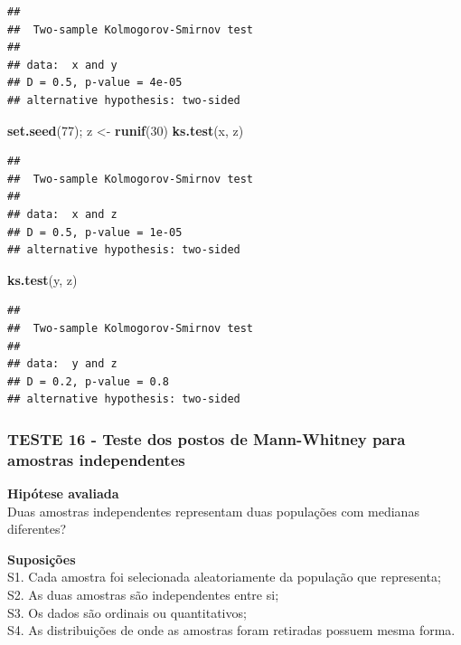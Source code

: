 \documentclass[
]{book}
\newenvironment{Shaded}{\begin{snugshade}}{\end{snugshade}}
\newcommand{\DecValTok}[1]{\textcolor[rgb]{0.00,0.00,0.81}{#1}}
\newcommand{\KeywordTok}[1]{\textcolor[rgb]{0.13,0.29,0.53}{\textbf{#1}}}
\newcommand{\NormalTok}[1]{#1}
\newcommand{\StringTok}[1]{\textcolor[rgb]{0.31,0.60,0.02}{#1}}
\theoremstyle{definition}
\theoremstyle{definition}
\theoremstyle{definition}
\theoremstyle{remark}
\begin{document}
\begin{verbatim}
## 
##  Two-sample Kolmogorov-Smirnov test
## 
## data:  x and y
## D = 0.5, p-value = 4e-05
## alternative hypothesis: two-sided
\end{verbatim}

\begin{Shaded}
\begin{Highlighting}[]
\KeywordTok{set.seed}\NormalTok{(}\DecValTok{77}\NormalTok{); z \textless{}{-}}\StringTok{ }\KeywordTok{runif}\NormalTok{(}\DecValTok{30}\NormalTok{)}
\KeywordTok{ks.test}\NormalTok{(x, z)}
\end{Highlighting}
\end{Shaded}

\begin{verbatim}
## 
##  Two-sample Kolmogorov-Smirnov test
## 
## data:  x and z
## D = 0.5, p-value = 1e-05
## alternative hypothesis: two-sided
\end{verbatim}

\begin{Shaded}
\begin{Highlighting}[]
\KeywordTok{ks.test}\NormalTok{(y, z)}
\end{Highlighting}
\end{Shaded}

\begin{verbatim}
## 
##  Two-sample Kolmogorov-Smirnov test
## 
## data:  y and z
## D = 0.2, p-value = 0.8
## alternative hypothesis: two-sided
\end{verbatim}

\hypertarget{teste-16---teste-dos-postos-de-mann-whitney-para-amostras-independentes}{%
\subsubsection*{TESTE 16 - Teste dos postos de Mann-Whitney para amostras independentes}\label{teste-16---teste-dos-postos-de-mann-whitney-para-amostras-independentes}}

\textbf{Hipótese avaliada}\\
Duas amostras independentes representam duas populações com medianas diferentes?

\textbf{Suposições}\\
S1. Cada amostra foi selecionada aleatoriamente da população que representa;\\
S2. As duas amostras são independentes entre si;\\
S3. Os dados são ordinais ou quantitativos;\\
S4. As distribuições de onde as amostras foram retiradas possuem mesma forma.
\end{document}
